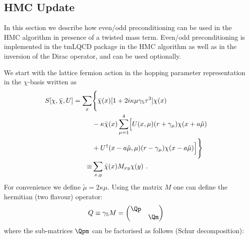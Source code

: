 \label{sec:eo}

\subsection{HMC Update}

In this section we describe how even/odd
\cite{DeGrand:1990dk,Jansen:1997yt} preconditioning can be used in the
HMC algorithm in 
presence of a twisted mass term. Even/odd preconditioning is
implemented in the tmLQCD package in the HMC algorithm as well as in
the inversion of the Dirac operator, and can be used optionally.

We start with the lattice fermion action in the hopping parameter
representation in the $\chi$-basis written as
\begin{equation}
  \label{eq:eo0}
    \begin{split}
    S[\chi,\bar\chi,U] = \sum_x & \Biggl\{ \bar\chi(x)[1+2i \kappa\mu\gamma_5\tau^3]\chi(x)  \Bigr. \\
    & -\kappa\bar\chi(x)\sum_{\mu = 1}^4\Bigl[ U(x,\mu)(r+\gamma_\mu)\chi(x+a\hat\mu)\bigr. \\
    & +\Bigl. \bigl. U^\dagger(x-a\hat\mu,\mu)(r-\gamma_\mu)\chi(x-a\hat\mu)\Bigr]
    \Biggr\} \\
    \equiv &\sum_{x,y}\bar\chi(x) M_{xy}\chi(y)\ .
  \end{split}
\end{equation}
For convenience we define
$\tilde\mu=2\kappa\mu$. Using the matrix $M$ one can define the
hermitian (two flavour) operator:
\begin{equation}
  \label{eq:eo1}
  Q\equiv \gamma_5 M = \begin{pmatrix}
    \Qp & \\\
    & \Qm \\
  \end{pmatrix}
\end{equation}
where the sub-matrices $\Qpm$ can be factorised as follows (Schur
decomposition): 
